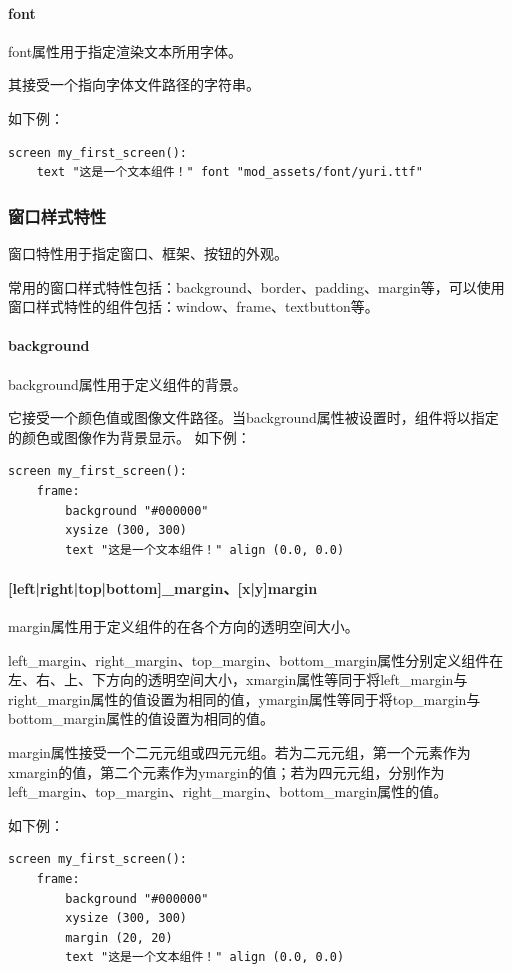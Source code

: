 \documentclass[../../Main.tex]{subfiles}
\begin{document}
\paragraph{font}
font属性用于指定渲染文本所用字体。

其接受一个指向字体文件路径的字符串。

如下例：
\begin{lstlisting}
screen my_first_screen():
    text "这是一个文本组件！" font "mod_assets/font/yuri.ttf"
\end{lstlisting}

\subsubsection{窗口样式特性}
窗口特性用于指定窗口、框架、按钮的外观。

常用的窗口样式特性包括：background、border、padding、margin等，可以使用窗口样式特性的组件包括：window、frame、textbutton等。

\paragraph{background}
background属性用于定义组件的背景。

它接受一个颜色值或图像文件路径。当background属性被设置时，组件将以指定的颜色或图像作为背景显示。
如下例：
\begin{lstlisting}
screen my_first_screen():
    frame:
        background "#000000"
        xysize (300, 300)
        text "这是一个文本组件！" align (0.0, 0.0)
\end{lstlisting}

\paragraph{[left|right|top|bottom]\_margin、[x|y]margin}
margin属性用于定义组件的在各个方向的透明空间大小。

left\_margin、right\_margin、top\_margin、bottom\_margin属性分别定义组件在左、右、上、下方向的透明空间大小，xmargin属性等同于将left\_margin与right\_margin属性的值设置为相同的值，ymargin属性等同于将top\_margin与bottom\_margin属性的值设置为相同的值。

margin属性接受一个二元元组或四元元组。若为二元元组，第一个元素作为xmargin的值，第二个元素作为ymargin的值；若为四元元组，分别作为left\_margin、top\_margin、right\_margin、bottom\_margin属性的值。

如下例：
\begin{lstlisting}
screen my_first_screen():
    frame:
        background "#000000"
        xysize (300, 300)
        margin (20, 20)
        text "这是一个文本组件！" align (0.0, 0.0)
\end{lstlisting}
\end{document}
